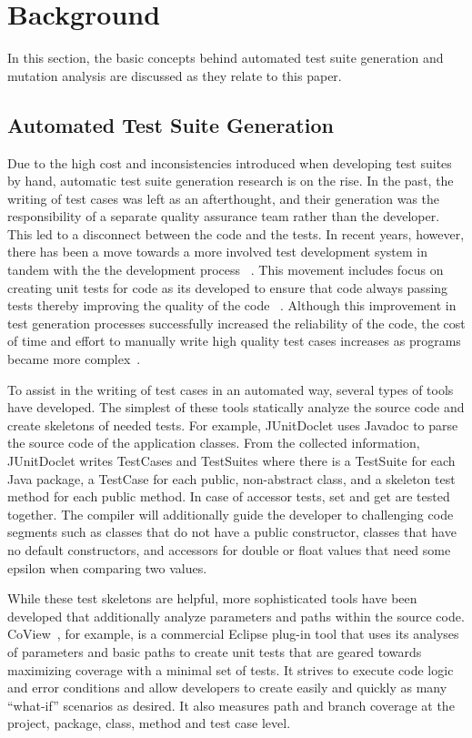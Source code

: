 \section{Background}
\label{sec:background}
In this section, the basic concepts behind automated test suite generation and mutation analysis are discussed as they relate to this paper.

\subsection{Automated Test Suite Generation}
Due to the high cost and inconsistencies introduced when developing test suites by hand, automatic test suite generation research is on the rise.  In the past, the writing of test cases was left as an afterthought, and their generation was the responsibility of a separate quality assurance team rather than the developer.  This led to a disconnect between the code and the tests.  In recent years, however, there has been a move towards a more involved test development system in tandem with the the development process ~\cite{Gelperin:1988:GST:62959.62965}.  This movement includes focus on creating unit tests for code as its developed to ensure that code always passing tests thereby improving the quality of the code ~\cite{Canfora:2006:EAT:1159733.1159788}.  Although this improvement in test generation processes successfully increased the reliability of the code, the cost of time and effort to manually write high quality test cases increases as programs became more complex~\cite{clarke1998automated}. 

To assist in the writing of test cases in an automated way, several types of tools have developed.  The simplest of these tools statically analyze the source code and create skeletons of  needed tests.  For example, JUnitDoclet \cite{JUnitDoclet} uses Javadoc to parse the source code of the application classes. From the collected information, JUnitDoclet writes TestCases and TestSuites where there is a TestSuite for each Java package, a TestCase for each public, non-abstract class, and a skeleton test method for each public method. In case of accessor tests, set and get are tested together.  The compiler will additionally guide the developer to challenging code segments such as classes that do not have a public constructor, classes that have no default constructors, and accessors for double or float values that need some epsilon when comparing two values.

While these test skeletons are helpful, more sophisticated tools have been developed that additionally analyze parameters and paths within the source code.  CoView~\cite{CoView}, for example, is a commercial Eclipse plug-in tool that uses its analyses of parameters and basic paths to create unit tests that are geared towards maximizing coverage with a minimal set of tests.  It strives to execute code logic and error conditions and allow developers to create easily and quickly as many ``what-if'' scenarios as desired. It also measures path and branch coverage at the project, package, class, method and test case level. 

